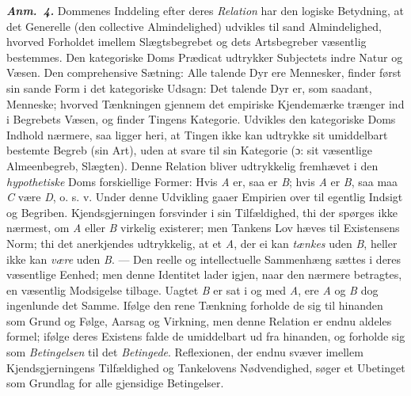 \documentclass[12pt]{book}
\newcommand{\anm}[1]{\emph{\textbf{Anm.~#1.}}}
\newcommand{\dsi}{\textup{ɔ:}}
\newcommand{\opage}[1]{\marginnote{\footnotesize\textit{[#1]}}}
\begin{document}
\anm{4} Dommenes Inddeling efter deres \emph{Relation} har den logiske
Betydning, at det Generelle (den collective Almindelighed) udvikles til sand
Almindelighed, hvorved Forholdet imellem Slægtsbegrebet og dets Artsbegreber
væsentlig bestemmes. Den kategoriske Doms Prædicat udtrykker Subjectets indre
Natur og Væsen. Den comprehensive Sætning: Alle talende Dyr ere Mennesker,
finder først sin sande Form i det kategoriske Udsagn: Det talende Dyr er, som
saadant, Menneske; hvorved Tænkningen gjennem det empiriske Kjendemærke trænger
ind i Begrebets Væsen, og finder Tingens Kategorie. Udvikles den kategoriske
Doms Indhold nærmere, saa ligger heri, at Tingen ikke kan udtrykke sit
umiddelbart bestemte Begreb (sin Art), uden at svare til sin Kategorie
(\dsi{} sit væsentlige Almeenbegreb, Slægten). Denne Relation bliver udtrykkelig
fremhævet i den \emph{hypothetiske} Doms forskiellige Former: Hvis \textit{A}
er, saa er \textit{B}; hvis \textit{A} er \textit{B}, saa maa \textit{C} være
\textit{D}, o. s. v. Under denne Udvikling gaaer Empirien over til egentlig
Indsigt og Begriben. Kjendsgjerningen forsvinder i sin Tilfældighed, thi der
spørges ikke nærmest, om \textit{A} eller \textit{B} virkelig existerer; men
Tankens Lov hæves til Existensens Norm; thi det anerkjendes udtrykkelig, at et
\textit{A}, der ei kan \emph{tænkes} uden \textit{B}, heller ikke kan
\emph{være} uden \textit{B}. --- Den reelle og intellectuelle Sammenhæng sættes
i deres væsentlige Eenhed; men denne
\opage{52} Identitet lader igjen, naar den nærmere betragtes, en væsentlig Modsigelse
tilbage. Uagtet \textit{B} er sat i og med \textit{A}, ere \textit{A} og
\textit{B} dog ingenlunde det Samme. Ifølge den rene Tænkning forholde de sig
til hinanden som Grund og Følge, Aarsag og Virkning, men denne Relation er endnu
aldeles formel; ifølge deres Existens falde de umiddelbart ud fra hinanden, og
forholde sig som \emph{Betingelsen} til det \emph{Betingede}. Reflexionen, der
endnu svæver imellem Kjendsgjerningens Tilfældighed og Tankelovens
Nødvendighed, søger et Ubetinget som Grundlag for alle gjensidige Betingelser.
\end{document}
